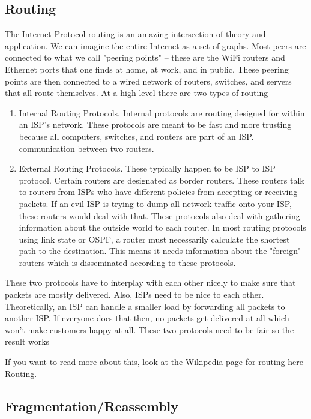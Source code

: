 \subsection{Routing}

The Internet Protocol routing is an amazing intersection of theory and application.
We can imagine the entire Internet as a set of graphs.
Most peers are connected to what we call "peering points" -- these are the WiFi routers and Ethernet ports that one finds at home, at work, and in public.
These peering points are then connected to a wired network of routers, switches, and servers that all route themselves.
At a high level there are two types of routing

\begin{enumerate}
\item Internal Routing Protocols.
  Internal protocols are routing designed for within an ISP's network.
  These protocols are meant to be fast and more trusting because all computers, switches, and routers are part of an ISP.
  communication between two routers.
\item External Routing Protocols.
  These typically happen to be ISP to ISP protocol.
  Certain routers are designated as border routers.
  These routers talk to routers from ISPs who have different policies from accepting or receiving packets.
  If an evil ISP is trying to dump all network traffic onto your ISP, these routers would deal with that.
  These protocols also deal with gathering information about the outside world to each router.
  In most routing protocols using link state or OSPF, a router must necessarily calculate the shortest path to the destination.
  This means it needs information about the "foreign" routers which is disseminated according to these protocols.
\end{enumerate}

These two protocols have to interplay with each other nicely to make sure that packets are mostly delivered.
Also, ISPs need to be nice to each other.
Theoretically, an ISP can handle a smaller load by forwarding all packets to another ISP.
If everyone does that then, no packets get delivered at all which won't make customers happy at all.
These two protocols need to be fair so the result works

If you want to read more about this, look at the Wikipedia page for routing here \href{https://en.wikipedia.org/wiki/Routing}{Routing}.

\subsection{Fragmentation/Reassembly}


